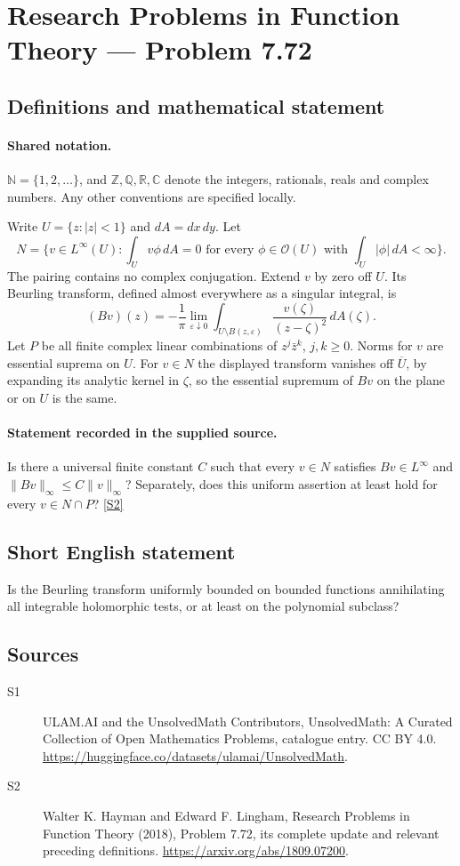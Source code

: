 \documentclass[11pt]{article}
\newcommand{\sref}[2]{\hyperlink{source:#1:#2}{[S#2]}}
\begin{document}
\section{Research Problems in Function Theory — Problem 7.72}\label{statement}

\subsection{Definitions and mathematical statement}

\paragraph{Shared notation.}$\mathbb N=\{1,2,\ldots\}$, and $\mathbb Z,\mathbb Q,\mathbb R,\mathbb C$ denote the integers, rationals, reals and complex numbers. Any other conventions are specified locally.


Write $U=\{z:|z|<1\}$ and $dA=dx\,dy$. Let
\[N=\{v\in L^\infty(U):\int_Uv\phi\,dA=0
\text{ for every }\phi\in\mathcal O(U)\text{ with }\int_U|\phi|\,dA<\infty\}.
\]
The pairing contains no complex conjugation. Extend $v$ by zero off $U$. Its Beurling transform, defined almost everywhere as a singular integral, is
\[(Bv)(z)=-\frac1\pi\lim_{\varepsilon\downarrow0}
\int_{U\setminus B(z,\varepsilon)}\frac{v(\zeta)}{(z-\zeta)^2}\,dA(\zeta).
\]
Let $P$ be all finite complex linear combinations of $z^j\bar z^k$, $j,k\ge0$. Norms for $v$ are essential suprema on $U$. For $v\in N$ the displayed transform vanishes off $\overline U$, by expanding its analytic kernel in $\zeta$, so the essential supremum of $Bv$ on the plane or on $U$ is the same.
\paragraph{Statement recorded in the supplied source.}
Is there a universal finite constant $C$ such that every $v\in N$ satisfies $Bv\in L^\infty$ and $\|Bv\|_\infty\le C\|v\|_\infty$? Separately, does this uniform assertion at least hold for every $v\in N\cap P$? \sref{statement}{2}
\subsection{Short English statement}
Is the Beurling transform uniformly bounded on bounded functions annihilating all integrable holomorphic tests, or at least on the polynomial subclass?
\subsection{Sources}
\begin{description}
\item[\hypertarget{source:statement:1}{S1}] ULAM.AI and the UnsolvedMath Contributors, UnsolvedMath: A Curated Collection of Open Mathematics Problems, catalogue entry. CC BY 4.0. \url{https://huggingface.co/datasets/ulamai/UnsolvedMath}.
\item[\hypertarget{source:statement:2}{S2}] Walter K. Hayman and Edward F. Lingham, Research Problems in Function Theory (2018), Problem 7.72, its complete update and relevant preceding definitions. \url{https://arxiv.org/abs/1809.07200}.
\end{description}
\label{end:statement}
\end{document}

